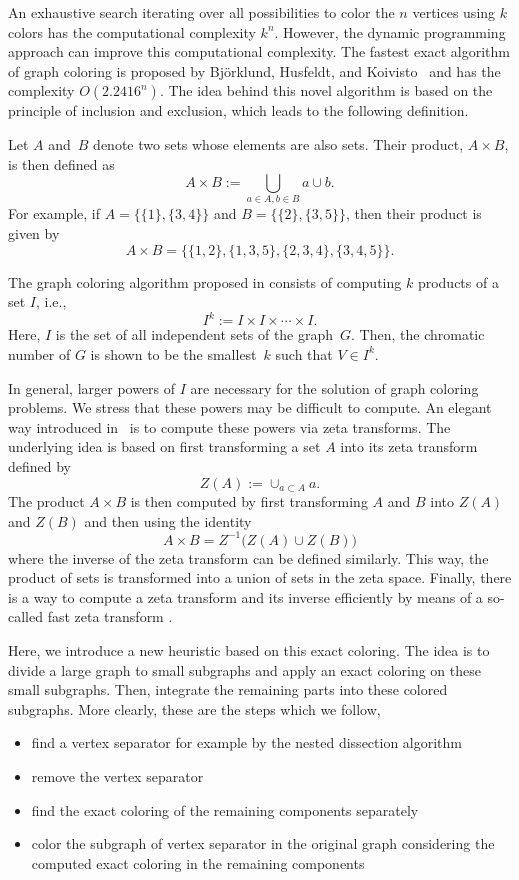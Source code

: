 \documentclass[12pt, twoside,a4paper,toc=bibliography]{scrbook}
\begin{document}
An exhaustive search iterating over all possibilities to color the $n$ vertices using $k$
colors has the computational complexity $k^n$. However, the dynamic programming approach
can improve this computational complexity. The fastest exact algorithm of graph coloring is proposed by
Bj{\"o}rklund, Husfeldt, and Koivisto~\cite{bjorklund2009} and has the complexity
$O(2.2416^n)$. The idea behind this novel algorithm is based on the principle of
inclusion and exclusion, which leads to the following definition.

Let $A$ and~$B$ denote two sets whose elements are also sets. Their product, $A\times B$,
is then defined as
$$
A\times B := \bigcup_{a\in A, b\in B}{a \cup b}.
$$
For example, if $A=\bigl\{ \{1\}, \{3,4\} \bigr\}$ and $B=\bigl\{ \{2\}, \{3,5\} \bigr\}$, then
their product is given by
\begin{equation}
\label{eq:axb}
A \times B=\bigl\{ \{1,2\}, \{1,3,5\}, \{2,3,4\}, \{3,4,5\} \bigr\} .
\end{equation}

The graph coloring algorithm proposed in \cite{bjorklund2009} consists of computing $k$
products of a set $I$, i.e.,
$$
I^k := I \times I  \times \cdots \times I .
$$
Here, $I$ is the set of all independent sets of the graph~$G$. Then, the chromatic number
of $G$ is shown to be the smallest~$k$ such that $V\in I^k$.

In general, larger powers of $I$ are necessary for the solution of graph coloring
problems. We stress that these powers may be difficult to compute. An elegant way
introduced in~\cite{bjorklund2009} is to compute these powers via zeta transforms. The
underlying idea is based on first transforming a set $A$ into its zeta transform defined
by
$$
Z(A) := \cup_{a \subset A} a.
$$
The product $A \times B$ is then computed by first transforming $A$ and $B$ into $Z(A)$
and $Z(B)$ and then using the identity
$$
A\times B = Z^{-1} \bigl( Z(A) \cup Z(B) \bigr)
$$
where the inverse of the zeta transform can be defined similarly. This way, the product
of sets is transformed into a union of sets in the zeta space. Finally, there is a way to
compute a zeta transform and its inverse efficiently by means of a so-called fast zeta
transform \cite{Knuth:1997:ACP:270146}.

Here, we introduce a new heuristic based on this exact coloring.
The idea is to divide a large graph to small subgraphs and apply an exact coloring
on these small subgraphs. Then, integrate the remaining parts into these colored
subgraphs.
More clearly, these are the steps which we follow,
\begin{itemize}
\item find a vertex separator for example by the nested dissection algorithm
\item remove the vertex separator
\item find the exact coloring of the remaining components separately
\item color the subgraph of vertex separator in the original graph considering
the computed exact coloring in the remaining components 
\end{itemize}
\end{document}
